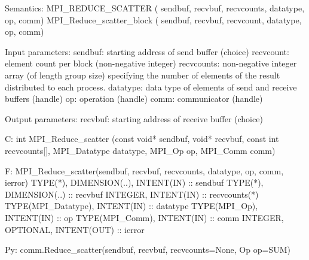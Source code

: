 Semantics:
MPI_REDUCE_SCATTER
   ( sendbuf, recvbuf, recvcounts, datatype, op, comm)
MPI_Reduce_scatter_block
   ( sendbuf, recvbuf, recvcount, datatype, op, comm)

Input parameters:
sendbuf: starting address of send buffer (choice)
recvcount: element count per block (non-negative integer) 
recvcounts: non-negative integer array (of length group size)
    specifying the number of elements of the result distributed to each
    process.
datatype: data type of elements of send and receive buffers (handle)
op: operation (handle)
comm: communicator (handle)

Output parameters:
recvbuf: starting address of receive buffer (choice)

C:
int MPI_Reduce_scatter
   (const void* sendbuf, void* recvbuf, const int recvcounts[],
    MPI_Datatype datatype, MPI_Op op, MPI_Comm comm)

F:
MPI_Reduce_scatter(sendbuf, recvbuf, recvcounts, datatype, op, comm,
ierror)
TYPE(*), DIMENSION(..), INTENT(IN) :: sendbuf
TYPE(*), DIMENSION(..) :: recvbuf
INTEGER, INTENT(IN) :: recvcounts(*)
TYPE(MPI_Datatype), INTENT(IN) :: datatype
TYPE(MPI_Op), INTENT(IN) :: op
TYPE(MPI_Comm), INTENT(IN) :: comm
INTEGER, OPTIONAL, INTENT(OUT) :: ierror

Py:
comm.Reduce_scatter(sendbuf, recvbuf, recvcounts=None, Op op=SUM)
